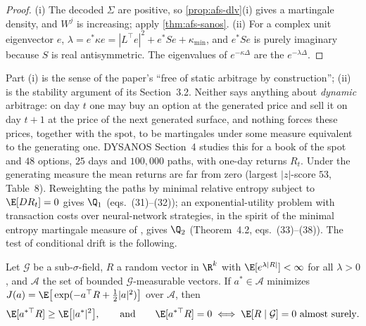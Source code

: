 \begin{proof}
(i) The decoded $\Sigma$ are positive, so \cref{prop:afs-dlv}(i) gives a martingale density, and $W^j$ is increasing;
apply \cref{thm:afs-sanos}. (ii) For a complex unit eigenvector $e$, $\lambda=e^*\kappa e=|L^\top e|^2+e^*Se+\kappa_{\min}$, and $e^*Se$ is purely
imaginary because $S$ is real antisymmetric. The eigenvalues of $e^{-\kappa\Delta}$ are the $e^{-\lambda\Delta}$.
\end{proof}

Part (i) is the sense of the paper's ``free of static arbitrage by construction''; (ii) is the stability argument of its
Section~3.2. Neither says anything about \emph{dynamic} arbitrage: on day $t$ one may buy an option at the generated price and
sell it on day $t+1$ at the price of the next generated surface, and nothing forces these prices, together with the spot, to be
martingales under some measure equivalent to the generating one. DYSANOS Section~4 studies this for a book of the spot and $48$ options,
$25$ days and $100{,}000$ paths, with one-day returns $R_t$. Under the generating measure the mean returns are far from zero
(largest $|z|$-score $53$, Table~8). Reweighting the paths by minimal relative entropy subject to $\E[DR_t]=0$ gives $\Q_1$
(eqs.~(31)--(32)); an exponential-utility problem with transaction costs over neural-network strategies, in the spirit of the
minimal entropy martingale measure of \textcite{frittelli-2000}, gives $\Q_2$ (Theorem~4.2, eqs.~(33)--(38)). The test of
conditional drift is the following.

\begin{proposition}\label{prop:afs-conditional-test}
Let $\mathcal G$ be a sub-$\sigma$-field, $R$ a random vector in $\R^k$ with $\E[e^{\lambda|R|}]<\infty$ for all $\lambda>0$, and $\mathcal A$ the set of
bounded $\mathcal G$-measurable vectors. If $a^*\in\mathcal A$ minimizes $J(a)=\E\big[\exp(-a^\top R+\frac12|a|^2)\big]$ over $\mathcal A$, then
\[
  \E[a^{*\top}R]\ge\E\big[|a^*|^2\big],\qquad\text{and}\qquad\E[a^{*\top}R]=0\iff\E[R\mid\mathcal G]=0\ \text{almost surely}.
\]
\end{proposition}

